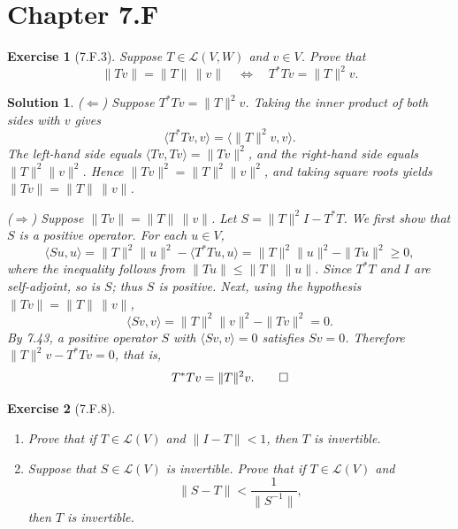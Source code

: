 \documentclass[11pt,a4paper]{article}
\newtheorem*{exercise}{Exercise}
\newtheorem*{solution}{Solution}
\begin{document}
\section*{Chapter 7.F}

\begin{exercise}[7.F.3]
Suppose $T \in \mathcal{L}(V, W)$ and $v \in V$. Prove that
\[
    \|Tv\| = \|T\|\,\|v\|
    \quad \Longleftrightarrow \quad
    T^*Tv = \|T\|^2 v.
\]
\end{exercise}

\begin{solution}
($\Leftarrow$) Suppose $T^*Tv = \|T\|^2 v$. Taking the inner product
of both sides with $v$ gives
\[
    \langle T^*Tv, v \rangle = \langle \|T\|^2 v, v \rangle.
\]
The left-hand side equals $\langle Tv, Tv \rangle = \|Tv\|^2$, and the
right-hand side equals $\|T\|^2 \|v\|^2$. Hence
$\|Tv\|^2 = \|T\|^2 \|v\|^2$, and taking square roots yields
$\|Tv\| = \|T\|\,\|v\|$.

\medskip
($\Rightarrow$) Suppose $\|Tv\| = \|T\|\,\|v\|$. Let
$S = \|T\|^2 I - T^*T$. We first show that $S$ is a positive operator.
For each $u \in V$,
\[
    \langle Su, u \rangle
    = \|T\|^2 \|u\|^2 - \langle T^*Tu, u \rangle
    = \|T\|^2 \|u\|^2 - \|Tu\|^2
    \geq 0,
\]
where the inequality follows from $\|Tu\| \leq \|T\|\,\|u\|$. Since
$T^*T$ and $I$ are self-adjoint, so is $S$; thus $S$ is positive.
Next, using the hypothesis $\|Tv\| = \|T\|\,\|v\|$,
\[
    \langle Sv, v \rangle
    = \|T\|^2 \|v\|^2 - \|Tv\|^2
    = 0.
\]
By 7.43, a positive operator $S$ with $\langle Sv, v \rangle = 0$
satisfies $Sv = 0$. Therefore $\|T\|^2 v - T^*Tv = 0$, that is,
\[
    T^*Tv = \|T\|^2 v. \qedhere
\]
\end{solution}

\begin{exercise}[7.F.8]
\begin{enumerate}
    \item[(a)] Prove that if $T \in \mathcal{L}(V)$ and $\|I - T\| < 1$,
    then $T$ is invertible.
    \item[(b)] Suppose that $S \in \mathcal{L}(V)$ is invertible. Prove
    that if $T \in \mathcal{L}(V)$ and
    \[
        \|S - T\| < \frac{1}{\|S^{-1}\|},
    \]
    then $T$ is invertible.
\end{enumerate}
\end{exercise}
\end{document}
